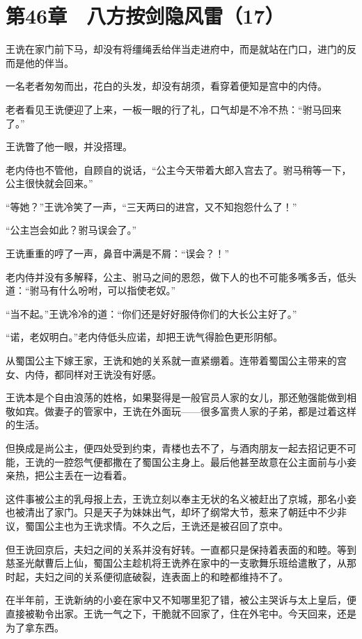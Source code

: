 \section{第46章　八方按剑隐风雷（17）}

王诜在家门前下马，却没有将缰绳丢给伴当走进府中，而是就站在门口，进门的反而是他的伴当。

一名老者匆匆而出，花白的头发，却没有胡须，看穿着便知是宫中的内侍。

老者看见王诜便迎了上来，一板一眼的行了礼，口气却是不冷不热：“驸马回来了。”

王诜瞥了他一眼，并没搭理。

老内侍也不管他，自顾自的说话，“公主今天带着大郎入宫去了。驸马稍等一下，公主很快就会回来。”

“等她？”王诜冷笑了一声，“三天两曰的进宫，又不知抱怨什么了！”

“公主岂会如此？驸马误会了。”

王诜重重的哼了一声，鼻音中满是不屑：“误会？！”

老内侍并没有多解释，公主、驸马之间的恩怨，做下人的也不可能多嘴多舌，低头道：“驸马有什么吩咐，可以指使老奴。”

“当不起。”王诜冷冷的道：“你们还是好好服侍你们的大长公主好了。”

“诺，老奴明白。”老内侍低头应诺，却把王诜气得脸色更形阴郁。

从蜀国公主下嫁王家，王诜和她的关系就一直紧绷着。连带着蜀国公主带来的宫女、内侍，都同样对王诜没有好感。

王诜本是个自由浪荡的姓格，如果娶得是一般官员人家的女儿，那还勉强能做到相敬如宾。做妻子的管家中，王诜在外面玩——很多富贵人家的子弟，都是过着这样的生活。

但换成是尚公主，便四处受到约束，青楼也去不了，与酒肉朋友一起去招记更不可能，王诜的一腔怨气便都撒在了蜀国公主身上。最后他甚至故意在公主面前与小妾亲热，把公主丢在一边看着。

这件事被公主的乳母报上去，王诜立刻以奉主无状的名义被赶出了京城，那名小妾也被清出了家门。只是天子为妹妹出气，却坏了纲常大节，惹来了朝廷中不少非议，蜀国公主也为王诜求情。不久之后，王诜还是被召回了京中。

但王诜回京后，夫妇之间的关系并没有好转。一直都只是保持着表面的和睦。等到慈圣光献曹后上仙，蜀国公主趁机将王诜养在家中的一支歌舞乐班给遣散了，从那时起，夫妇之间的关系便彻底破裂，连表面上的和睦都维持不了。

在半年前，王诜新纳的小妾在家中又不知哪里犯了错，被公主哭诉与太上皇后，便直接被勒令出家。王诜一气之下，干脆就不回家了，住在外宅中。今天回来，还是为了拿东西。

